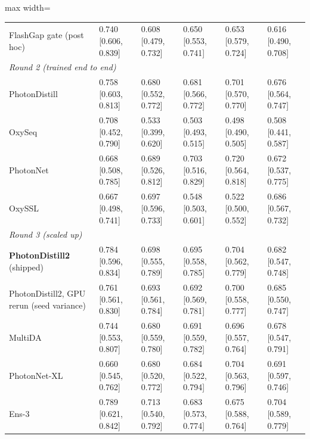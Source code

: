 {\begin{adjustbox}{max width=\linewidth}
\begin{tabular}{p{3.4cm}lllll}
FlashGap gate (post hoc) & 0.740 [0.606, 0.839] & 0.608 [0.479, 0.732] & 0.650 [0.553, 0.741] & 0.653 [0.579, 0.724] & 0.616 [0.490, 0.708] \\
\multicolumn{6}{l}{\emph{Round 2 (trained end to end)}} \\
PhotonDistill & 0.758 [0.603, 0.813] & 0.680 [0.552, 0.772] & 0.681 [0.566, 0.772] & 0.701 [0.570, 0.770] & 0.676 [0.564, 0.747] \\
OxySeq & 0.708 [0.452, 0.790] & 0.533 [0.399, 0.620] & 0.503 [0.493, 0.515] & 0.498 [0.490, 0.505] & 0.508 [0.441, 0.587] \\
PhotonNet & 0.668 [0.508, 0.785] & 0.689 [0.526, 0.812] & 0.703 [0.516, 0.829] & 0.720 [0.564, 0.818] & 0.672 [0.537, 0.775] \\
OxySSL & 0.667 [0.498, 0.741] & 0.697 [0.596, 0.733] & 0.548 [0.503, 0.601] & 0.522 [0.500, 0.552] & 0.686 [0.567, 0.732] \\
\multicolumn{6}{l}{\emph{Round 3 (scaled up)}} \\
\textbf{PhotonDistill2} (shipped) & 0.784 [0.596, 0.834] & 0.698 [0.555, 0.789] & 0.695 [0.558, 0.785] & 0.704 [0.562, 0.779] & 0.682 [0.547, 0.748] \\
PhotonDistill2, GPU rerun (seed variance) & 0.761 [0.561, 0.830] & 0.693 [0.561, 0.784] & 0.692 [0.569, 0.781] & 0.700 [0.558, 0.777] & 0.685 [0.550, 0.747] \\
MultiDA & 0.744 [0.553, 0.807] & 0.680 [0.559, 0.780] & 0.691 [0.559, 0.782] & 0.696 [0.557, 0.764] & 0.678 [0.547, 0.791] \\
PhotonNet-XL & 0.660 [0.545, 0.762] & 0.680 [0.520, 0.772] & 0.684 [0.522, 0.794] & 0.704 [0.563, 0.796] & 0.691 [0.597, 0.746] \\
Ens-3 & 0.789 [0.621, 0.842] & 0.713 [0.540, 0.792] & 0.683 [0.573, 0.774] & 0.675 [0.588, 0.764] & 0.704 [0.589, 0.779] \\
\bottomrule
\end{tabular}
\end{adjustbox}
}
